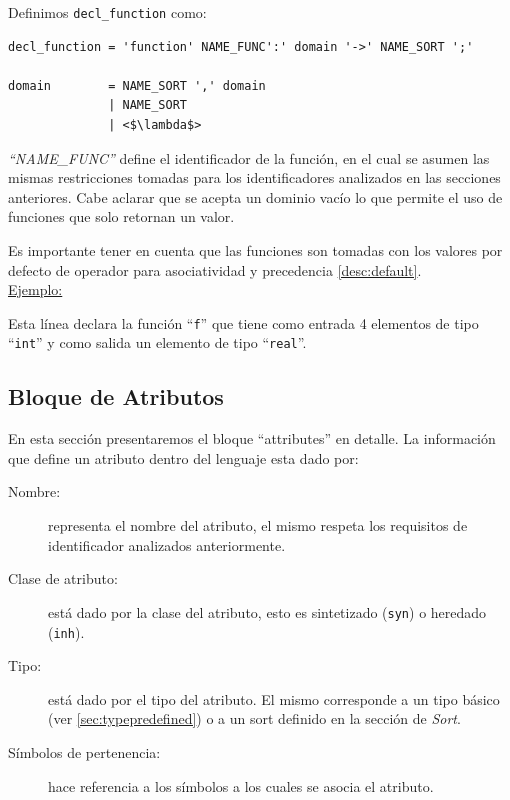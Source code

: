 Definimos \texttt{decl\_function} como:

\begin{lstlisting}[escapeinside=<>,frame=shadowbox, rulesepcolor=\color{blue}, language=inform ]
decl_function = 'function' NAME_FUNC':' domain '->' NAME_SORT ';'

domain        = NAME_SORT ',' domain
              | NAME_SORT 
              | <$\lambda$>
\end{lstlisting}

\textit{``NAME\_FUNC''} define el identificador de la función, en el cual se asumen las mismas restricciones tomadas para los identificadores analizados en las secciones anteriores. Cabe aclarar que se acepta un dominio vacío lo que permite el uso de funciones que solo retornan un valor.

Es importante tener en cuenta que las funciones son tomadas con los valores por defecto de operador para asociatividad y precedencia \ref{desc:default}.\\

\underline{Ejemplo:}\ \begin{center}
                                                                           \end{center}
\vspace{0.2cm}
Esta línea declara la función ``\texttt{f}'' que tiene como entrada 4 elementos de tipo ``\texttt{int}'' y como salida un elemento de tipo ``\texttt{real}''.

\subsection{Bloque de Atributos}
En esta sección presentaremos el bloque ``attributes'' en detalle. La información que define un atributo dentro del lenguaje esta dado por: 

\begin{description}
\item [Nombre:] representa el nombre del atributo, el mismo respeta los requisitos de identificador analizados anteriormente.

\item [Clase de atributo:] está dado por la clase del atributo, esto es sintetizado (\texttt{syn}) o heredado (\texttt{inh}).

\item [Tipo:] está dado por el tipo del atributo. El mismo corresponde a un tipo básico (ver \ref{sec:typepredefined}) o a un sort definido en la sección de \textit{Sort}.

\item [Símbolos de pertenencia:] hace referencia a los símbolos a los cuales se asocia el atributo.
\end{description}

